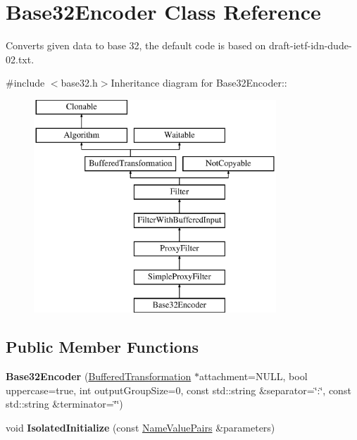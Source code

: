 \hypertarget{class_base32_encoder}{
\section{Base32Encoder Class Reference}
\label{class_base32_encoder}
}


Converts given data to base 32, the default code is based on draft-\/ietf-\/idn-\/dude-\/02.txt.  


{\ttfamily \#include $<$base32.h$>$}Inheritance diagram for Base32Encoder::\begin{figure}[H]
\begin{center}
\leavevmode
\includegraphics[height=8cm]{class_base32_encoder}
\end{center}
\end{figure}
\subsection*{Public Member Functions}
\begin{DoxyCompactItemize}
\item 
\hypertarget{class_base32_encoder_a59750e7d7d476a8e42ebe4945aa4b104}{
{\bfseries Base32Encoder} (\hyperlink{class_buffered_transformation}{BufferedTransformation} $\ast$attachment=NULL, bool uppercase=true, int outputGroupSize=0, const std::string \&separator=\char`\"{}:\char`\"{}, const std::string \&terminator=\char`\"{}\char`\"{})}
\label{class_base32_encoder_a59750e7d7d476a8e42ebe4945aa4b104}

\item 
\hypertarget{class_base32_encoder_a51672a74492c2dd31c7cada0471c6326}{
void {\bfseries IsolatedInitialize} (const \hyperlink{class_name_value_pairs}{NameValuePairs} \&parameters)}
\label{class_base32_encoder_a51672a74492c2dd31c7cada0471c6326}

\end{DoxyCompactItemize}


